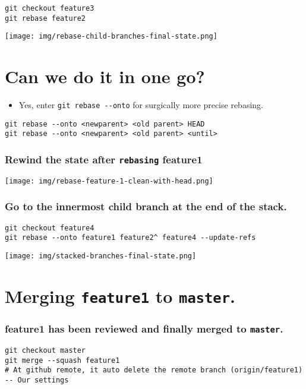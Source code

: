 \documentclass[11pt]{article}
\begin{document}
\begin{verbatim}
git checkout feature3
git rebase feature2
\end{verbatim}
\begin{center}
\texttt{[image: img/rebase-child-branches-final-state.png]}
\label{orge572f6b}
\end{center}
\section{Can we do it in one go?}
\label{sec:org4990027}
\begin{itemize}
\item Yes, enter \texttt{git rebase -{}-{}onto} for surgically more precise rebasing.
\end{itemize}

\begin{verbatim}
git rebase --onto <newparent> <old parent> HEAD
git rebase --onto <newparent> <old parent> <until>
\end{verbatim}
\subsubsection{Rewind the state after \texttt{rebasing} feature1}
\label{sec:orga545ba4}
\begin{center}
\texttt{[image: img/rebase-feature-1-clean-with-head.png]}
\label{orgfb09df7}
\end{center}
\subsubsection{Go to the innermost child branch at the end of the stack.}
\label{sec:orgd2fe6a2}
\begin{verbatim}
git checkout feature4
git rebase --onto feature1 feature2^ feature4 --update-refs
\end{verbatim}
\begin{center}
\texttt{[image: img/stacked-branches-final-state.png]}
\label{org48649c2}
\end{center}
\section{Merging \texttt{feature1} to \texttt{master}.}
\label{sec:orga2a1415}
\subsubsection{feature1 has been reviewed and finally merged to \texttt{master}.}
\label{sec:org5b18b8f}
\begin{verbatim}
git checkout master
git merge --squash feature1
# At github remote, it auto delete the remote branch (origin/feature1) -- Our settings
\end{verbatim}
\end{document}
